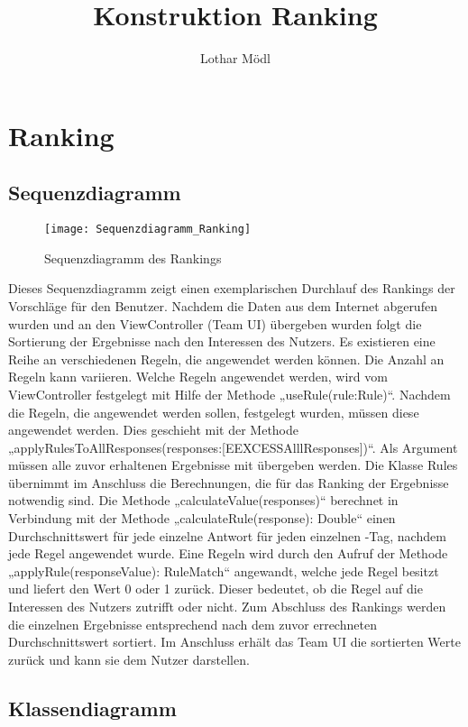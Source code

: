 
\title{Konstruktion Ranking}
\author{Lothar Mödl}

\chapter{Ranking}
\section{Sequenzdiagramm}

\begin{figure}[h]
	\centering
	\texttt{[image: Sequenzdiagramm\_Ranking]}
	\caption{Sequenzdiagramm des Rankings}
	\label{fig:Ranking Sequenzdiagramm}
\end{figure}

Dieses Sequenzdiagramm zeigt einen exemplarischen Durchlauf des Rankings der Vorschläge für den Benutzer. Nachdem die Daten aus dem Internet abgerufen wurden und an den ViewController (Team UI) übergeben wurden folgt die Sortierung der Ergebnisse nach den Interessen des Nutzers. Es existieren eine Reihe an verschiedenen Regeln, die angewendet werden können. Die Anzahl an Regeln kann variieren. Welche Regeln angewendet werden, wird vom ViewController festgelegt mit Hilfe der Methode „useRule(rule:Rule)“. Nachdem die Regeln, die angewendet werden sollen, festgelegt wurden, müssen diese angewendet werden. Dies geschieht mit der Methode „applyRulesToAllResponses(responses:[EEXCESSAlllResponses])“. Als Argument müssen alle zuvor erhaltenen Ergebnisse mit übergeben werden. Die Klasse Rules übernimmt im Anschluss die Berechnungen, die für das Ranking der Ergebnisse notwendig sind. Die Methode „calculateValue(responses)“ berechnet in Verbindung mit der Methode „calculateRule(response): Double“ einen Durchschnittswert für jede einzelne Antwort für jeden einzelnen \SEARCH-Tag, nachdem jede Regel angewendet wurde. Eine Regeln wird durch den Aufruf der Methode „applyRule(responseValue): RuleMatch“ angewandt, welche jede Regel besitzt und liefert den Wert 0 oder 1 zurück. Dieser bedeutet, ob die Regel auf die Interessen des Nutzers zutrifft oder nicht. Zum Abschluss des Rankings werden die einzelnen Ergebnisse entsprechend nach dem zuvor errechneten Durchschnittswert sortiert. Im Anschluss erhält das Team UI die sortierten Werte zurück und kann sie dem Nutzer darstellen. 

\section{Klassendiagramm}

